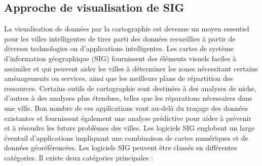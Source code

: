\documentclass[french, a4paper, 12pt]{report}
\begin{document}
\subsection{Approche de visualisation de SIG}
La visualisation de données par la cartographie est devenue un moyen essentiel pour les villes intelligentes de tirer parti des données recueillies à partir de diverses technologies ou d’applications intelligentes. Les cartes de système d'information géographique (SIG) fournissent des éléments visuels faciles à assimiler et qui peuvent aider les villes à déterminer les zones nécessitant certains aménagements ou services, ainsi que les meilleurs plans de répartition des ressources.
Certains outils de cartographie sont destinées à des analyses de niche, d'autres à des analyses plus étendues, telles que les réparations nécessaires dans une ville. Bon nombre de ces applications vont au-delà du traçage des données existantes et fournissent également une analyse prédictive pour aider à prévenir et à résoudre les futurs problèmes des villes.
Les logiciels SIG englobent un large éventail d'applications impliquant une combinaison de cartes numériques et de données géoréférencées. Les logiciels SIG peuvent être classés en différentes catégories.
Il existe deux catégories principales :  
\end{document}
